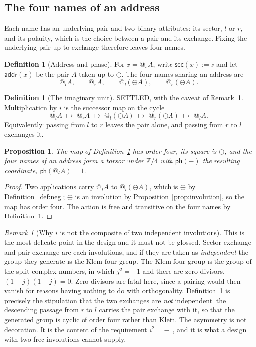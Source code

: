 \documentclass[11pt]{article}
\makeatletter
\newtheorem{proposition}[theorem]{Proposition}
\theoremstyle{definition}
\newtheorem{definition}[theorem]{Definition}
\theoremstyle{remark}
\newtheorem{remark}[theorem]{Remark}
\newcommand{\quo}[1]{\ensuremath{@_{#1}}}
\newcommand{\negop}{\ensuremath{\ominus}}
\newcommand{\sect}[1]{\ensuremath{\mathsf{sec}(#1)}}
\newcommand{\addr}[1]{\ensuremath{\mathsf{addr}(#1)}}
\newcommand{\phase}[1]{\ensuremath{\mathsf{ph}(#1)}}
\makeatother
\begin{document}
\subsection{The four names of an address}

Each name has an underlying pair and two binary attributes: its sector, $l$ or
$r$, and its polarity, which is the choice between a pair and its exchange.
Fixing the underlying pair up to exchange therefore leaves four names.

\begin{definition}[Address and phase]
\label{def:addr}
For $x = \quo{s}A$, write $\sect{x} := s$ and let $\addr{x}$ be the pair $A$
taken up to $\negop$. The four names sharing an address are
\[
  \quo{l}A, \qquad \quo{r}A, \qquad \quo{l}(\negop A), \qquad \quo{r}(\negop A).
\]
\end{definition}

\begin{definition}[The imaginary unit]
\label{def:i}
SETTLED, with the caveat of Remark~\ref{rem:klein}. Multiplication by $i$ is the
successor map on the cycle
\[
  \quo{l}A \;\longmapsto\; \quo{r}A \;\longmapsto\; \quo{l}(\negop A)
  \;\longmapsto\; \quo{r}(\negop A) \;\longmapsto\; \quo{l}A .
\]
Equivalently: passing from $l$ to $r$ leaves the pair alone, and passing from
$r$ to $l$ exchanges it.
\end{definition}

\begin{proposition}
\label{prop:z4}
The map of Definition~\ref{def:i} has order four, its square is $\negop$, and the
four names of an address form a torsor under $\mathbb{Z}/4$ with $\phase{-}$ the
resulting coordinate, $\phase{\quo{l}A} = 1$.
\end{proposition}

\begin{proof}
Two applications carry $\quo{l}A$ to $\quo{l}(\negop A)$, which is $\negop$ by
Definition~\ref{def:neg}; $\negop$ is an involution by
Proposition~\ref{prop:involution}, so the map has order four. The action is free
and transitive on the four names by Definition~\ref{def:addr}.
\end{proof}

\begin{remark}[Why $i$ is not the composite of two independent involutions]
\label{rem:klein}
This is the most delicate point in the design and it must not be glossed.
Sector exchange and pair exchange are each involutions, and if they are taken as
\emph{independent} the group they generate is the Klein four-group. The Klein
four-group is the group of the split-complex numbers, in which $j^2 = +1$ and
there are zero divisors, $(1+j)(1-j) = 0$. Zero divisors are fatal here, since a
pairing would then vanish for reasons having nothing to do with orthogonality.
Definition~\ref{def:i} is precisely the stipulation that the two exchanges are
\emph{not} independent: the descending passage from $r$ to $l$ carries the pair
exchange with it, so that the generated group is cyclic of order four rather
than Klein. The asymmetry is not decoration. It is the content of the
requirement $i^2 = -1$, and it is what a design with two free involutions cannot
supply.
\end{remark}
\end{document}
